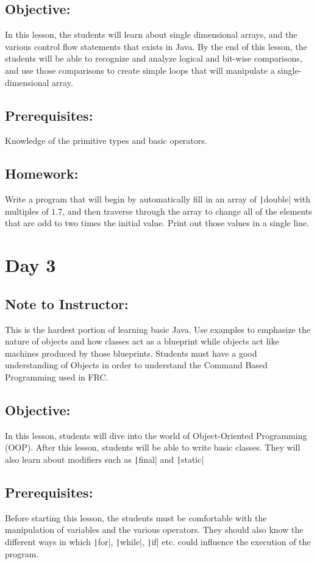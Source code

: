 \documentclass[11pt,fleqn]{article}
\newcommand{\mil}[2][java]{\texttt|#2|}
\begin{document}
\subsection*{Objective:} In this lesson, the students will learn about single dimensional arrays, and the various control flow statements that exists in Java. By the end of this lesson, the students will be able to recognize and analyze logical and bit-wise comparisons, and use those comparisons to create simple loops that will manipulate a single-dimensional array.
\subsection*{Prerequisites:} Knowledge of the primitive types and basic operators.  

\subsection*{Homework:} Write a program that will begin by automatically fill in an array of \mil{double} with multiples of $1.7$, and then traverse through the array to change all of the elements that are odd to two times the initial value. Print out those values in a single line.
\newpage
\section*{Day 3}
\subsection*{Note to Instructor:} This is the hardest portion of learning basic Java. Use examples to emphasize the nature of objects and how classes act as a blueprint while objects act like machines produced by those blueprints. Students must have a good understanding of Objects in order to understand the Command Based Programming used in FRC.
\subsection*{Objective:} In this lesson, students will dive into the world of Object-Oriented Programming (OOP). After this lesson, students will be able to write basic classes. They will also learn about modifiers such as \mil{final} and \mil{static}
\subsection*{Prerequisites:} Before starting this lesson, the students must be comfortable with the manipulation of variables and the various operators. They should also know the different ways in which \mil{for}, \mil{while}, \mil{if} etc. could influence the execution of the program.
\end{document}
